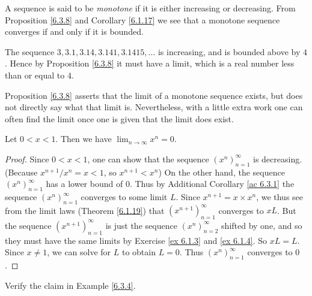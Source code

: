 \begin{note}
    A sequence is said to be \emph{monotone} if it is either increasing or decreasing.
    From Proposition \ref{6.3.8} and Corollary \ref{6.1.17} we see that a monotone sequence converges if and only if it is bounded.
\end{note}

\begin{example}\label{6.3.9}
    The sequence \(3, 3.1, 3.14, 3.141, 3.1415, \dots\) is increasing, and is bounded above by \(4\).
    Hence by Proposition \ref{6.3.8} it must have a limit, which is a real number less than or equal to \(4\).
\end{example}

\begin{note}
    Proposition \ref{6.3.8} asserts that the limit of a monotone sequence exists, but does not directly say what that limit is.
    Nevertheless, with a little extra work one can often find the limit once one is given that the limit does exist.
\end{note}

\begin{proposition}\label{6.3.10}
    Let \(0 < x < 1\).
    Then we have \(\lim_{n \to \infty} x^n = 0\).
\end{proposition}

\begin{proof}
    Since \(0 < x < 1\), one can show that the sequence \((x^n)_{n = 1}^\infty\) is decreasing.
    (Because \(x^{n + 1} / x^n = x < 1\), so \(x^{n + 1} < x^n\))
    On the other hand, the sequence \((x^n)_{n = 1}^\infty\) has a lower bound of \(0\).
    Thus by Additional Corollary \ref{ac 6.3.1} the sequence \((x^n)_{n = 1}^\infty\) converges to some limit \(L\).
    Since \(x^{n + 1} = x \times x^n\), we thus see from the limit laws (Theorem \ref{6.1.19}) that \((x^{n + 1})_{n = 1}^\infty\) converges to \(xL\).
    But the sequence \((x^{n + 1})_{n = 1}^\infty\) is just the sequence \((x^n)_{n = 2}^\infty\) shifted by one, and so they must have the same limits by Exercise \ref{ex 6.1.3} and \ref{ex 6.1.4}.
    So \(xL = L\).
    Since \(x \neq 1\), we can solve for \(L\) to obtain \(L = 0\).
    Thus \((x^n)_{n = 1}^\infty\) converges to \(0\).
\end{proof}

\exercisesection

\begin{exercise}\label{ex 6.3.1}
    Verify the claim in Example \ref{6.3.4}.
\end{exercise}


